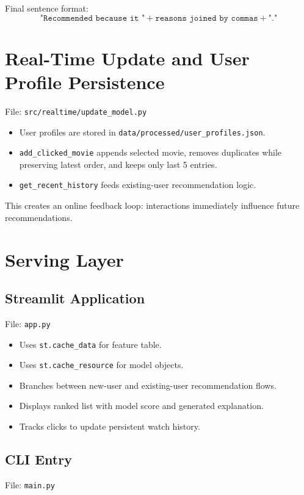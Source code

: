 \documentclass[11pt,a4paper]{article}
\begin{document}
Final sentence format:
\begin{equation}
\texttt{"Recommended because it "} + \texttt{reasons joined by commas} + \texttt{"."}
\end{equation}

\section{Real-Time Update and User Profile Persistence}
File: \texttt{src/realtime/update\_model.py}

\begin{itemize}[leftmargin=1.5em]
    \item User profiles are stored in \texttt{data/processed/user\_profiles.json}.
    \item \texttt{add\_clicked\_movie} appends selected movie, removes duplicates while preserving latest order, and keeps only last 5 entries.
    \item \texttt{get\_recent\_history} feeds existing-user recommendation logic.
\end{itemize}

This creates an online feedback loop: interactions immediately influence future recommendations.

\section{Serving Layer}
\subsection{Streamlit Application}
File: \texttt{app.py}

\begin{itemize}[leftmargin=1.5em]
    \item Uses \texttt{st.cache\_data} for feature table.
    \item Uses \texttt{st.cache\_resource} for model objects.
    \item Branches between new-user and existing-user recommendation flows.
    \item Displays ranked list with model score and generated explanation.
    \item Tracks clicks to update persistent watch history.
\end{itemize}

\subsection{CLI Entry}
File: \texttt{main.py}
\end{document}
